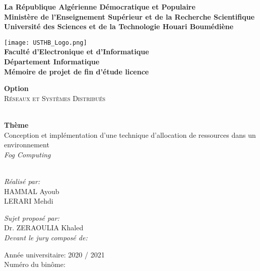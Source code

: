 \begin{titlepage}
\begin{center}

\textbf{
La République Algérienne Démocratique et Populaire\\[0.1cm]
Ministère de l'Enseignement Supérieur et de la Recherche Scientifique\\[0.1cm]
Université des Sciences et de la Technologie Houari Boumédiène\\[0.5cm]}

\texttt{[image: USTHB\_Logo.png]}\\[1cm]

{\Large \textbf{
Faculté d’Electronique et d’Informatique\\[0,1cm]
Département Informatique\\[0,1cm]
Mémoire de projet de fin d'étude licence\\[0.5cm]}}

{\Large \textbf{Option\\[0.5cm]}
\textsc{Réseaux et Systèmes Distribués\\}}

\HRule \\[0.4cm]
{\huge 
{\bfseries Thème}\\
Conception et implémentation d'une
technique d'allocation de ressources
dans un environnement \\ \emph{Fog Computing}\\[0.4cm]}
\HRule \\[1.5cm]

\normalsize
\begin{minipage}[t]{0.4\textwidth}
\begin{flushleft}
\large
\emph{Réalisé par:}\\
\textsc{HAMMAL} Ayoub\\
\textsc{LERARI} Mehdi
\end{flushleft}
\end{minipage}
%
\begin{minipage}[t]{0.4\textwidth}
\begin{flushright} 
\large
\emph{Sujet proposé par:}\\
Dr. \textsc{ZERAOULIA} Khaled\\[1.5cm]
\emph{Devant le jury composé de:}\\
\end{flushright}
\end{minipage}

\vfill

{\large Année universitaire: 2020 / 2021}\\
{\large Numéro du binôme: }

\end{center}
\end{titlepage}